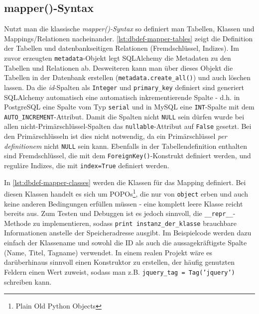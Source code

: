 
\subsection{mapper()-Syntax}

Nutzt man die klassische \emph{mapper()-Syntax} so definiert man Tabellen,
Klassen und Mappings/Relationen nacheinander.
\autoref{lst:dbdef-mapper-tables} zeigt die Definition der Tabellen und
datenbankseitigen Relationen (Fremdschlüssel, Indizes). Im zuvor erzeugten
\texttt{metadata}-Objekt legt SQLAlchemy die Metadaten zu den Tabellen und
Relationen ab. Desweiteren kann man über dieses Objekt die Tabellen in der
Datenbank erstellen (\texttt{metadata.create\_all()}) und auch löschen lassen.
Da die \emph{id}-Spalten als \texttt{Integer} und \texttt{primary\_key}
definiert sind generiert SQLAlchemy automatisch eine automatisch
inkrementierende Spalte - d.h. in PostgreSQL eine Spalte vom Typ \texttt{serial}
und in MySQL eine \texttt{INT}-Spalte mit dem \texttt{AUTO\_INCREMENT}-Attribut.
Damit die Spalten nicht \texttt{NULL} sein dürfen wurde bei allen
nicht-Primärschlüssel-Spalten das \texttt{nullable}-Attribut auf \texttt{False}
gesetzt. Bei den Primärschlüsseln ist dies nicht notwendig, da ein
Primärschlüssel \textit{per definitionem} nicht \texttt{NULL} sein kann.
Ebenfalls in der Tabellendefinition enthalten sind Fremdschlüssel, die mit dem
\texttt{ForeignKey()}-Konstrukt definiert werden, und reguläre Indizes, die mit
\texttt{index=True} definiert werden.



In \autoref{lst:dbdef-mapper-classes} werden die Klassen für das Mapping
definiert. Bei diesen Klassen handelt es sich um POPOs\footnote{Plain Old Python
Objects}, die nur von \texttt{object} erben und auch keine anderen Bedingungen
erfüllen müssen - eine komplett leere Klasse reicht bereits aus. Zum Testen und
Debuggen ist es jedoch sinnvoll, die \texttt{\_\_repr\_\_}-Methode zu
implementieren, sodass \texttt{print instanz\_der\_klasse} brauchbare
Informationen anstelle der Speicheradresse ausgibt. Im Beispielcode werden dazu
einfach der Klassename und sowohl die ID als auch die aussagekräftigste Spalte
(Name, Titel, Tagname) verwendet. In einem realen Projekt wäre es darüberhinaus
sinnvoll einen Konstruktor zu erstellen, der häufig genutzten Feldern einen Wert
zuweist, sodass man z.B. \texttt{jquery\_tag = Tag('jquery')} schreiben kann.

